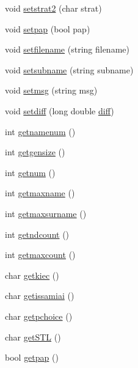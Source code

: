 \begin{DoxyCompactItemize}
\item 
void \mbox{\hyperlink{class_important_values_aab7df838b103431bd800aedb24dc8d76}{setstrat2}} (char strat)
\item 
void \mbox{\hyperlink{class_important_values_aa4e578426fe4e1e77bc4ba6fc53cf2e1}{setpap}} (bool pap)
\item 
void \mbox{\hyperlink{class_important_values_ac48776a72e43a41723a546f645aee9d0}{setfilename}} (string filename)
\item 
void \mbox{\hyperlink{class_important_values_a08d03f417fbded667041a6c78132b766}{setsubname}} (string subname)
\item 
void \mbox{\hyperlink{class_important_values_ae7f8cdfdd0dd637e21ea86be2052d976}{setmsg}} (string msg)
\item 
void \mbox{\hyperlink{class_important_values_a29e526c597a0b2ca781142baf780ae40}{setdiff}} (long double \mbox{\hyperlink{_mutual_8cpp_ae6c31fc00bc7f0cfda97440db3377063}{diff}})
\item 
int \mbox{\hyperlink{class_important_values_af6e0630530f84a70e5894e424f16c02f}{getnamenum}} ()
\item 
int \mbox{\hyperlink{class_important_values_ac804f5ac5bb49023195e590a1aa5c1a6}{getgensize}} ()
\item 
int \mbox{\hyperlink{class_important_values_a1dddb997f8e1a1a62a731c27597f8b2a}{getnum}} ()
\item 
int \mbox{\hyperlink{class_important_values_aef765ad3d6314500ee75d074ce6568ed}{getmaxname}} ()
\item 
int \mbox{\hyperlink{class_important_values_a86a09aed8f7ecdc5e50c130eed05ec57}{getmaxsurname}} ()
\item 
int \mbox{\hyperlink{class_important_values_abec6d0cdd3dfda4e46f8b54361b9f699}{getndcount}} ()
\item 
int \mbox{\hyperlink{class_important_values_a5388dee379d80b92eed35d43a3a30cfc}{getmaxcount}} ()
\item 
char \mbox{\hyperlink{class_important_values_a3a88b32866d3496c09da92b21b14aabb}{getkiec}} ()
\item 
char \mbox{\hyperlink{class_important_values_a2b71f3520afe908b89cf926935a95b5d}{getissamiai}} ()
\item 
char \mbox{\hyperlink{class_important_values_ae0308570fe14b1a41458daf1fda46487}{getpchoice}} ()
\item 
char \mbox{\hyperlink{class_important_values_a97db94c67dfefb6f0e10fd447e365a38}{get\+S\+TL}} ()
\item 
bool \mbox{\hyperlink{class_important_values_a6ae784a3a09385242bba188d8c4e2b53}{getpap}} ()

\end{DoxyCompactItemize}
